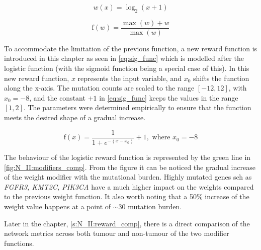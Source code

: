\begin{equation} \label{eq:w}
    w(x) = \log_2(x+1)
\end{equation}

\begin{equation} \label{eq:norm3_func}
\text{f}(w) = \frac{\max(w) + w}{\max(w)}
\end{equation}

To accommodate the limitation of the previous function, a new reward function is introduced in this chapter as seen in \cref{eq:sig_func} which is modelled after the logistic function (with the sigmoid function being a special case of this). In this new reward function, $x$ represents the input variable, and $x_0$ shifts the function along the x-axis. The mutation counts are scaled to the range $[-12, 12]$, with $x_0 = -8$, and the constant $+1$ in \cref{eq:sig_func} keeps the values in the range $[1, 2]$. The parameters were determined empirically to ensure that the function meets the desired shape of a gradual increase.

\begin{equation} \label{eq:sig_func}
\text{f}(x) =  \frac{1}{1 + e^{-(x - x_0)}} + 1, \text{ where } x_0=-8
\end{equation}

The behaviour of the logistic reward function is represented by the green line in \cref{fig:N_II:modifiers_comp}. From the figure it can be noticed the gradual increase of the weight modifier with the mutational burden. Highly mutated genes sch as \textit{FGFR3, KMT2C, PIK3CA} have a much higher impact on the weights compared to the previous weight function. It also worth noting that a 50\% increase of the weight value happens at a point of $\sim30$ mutation burden.

Later in the chapter, \cref{s:N_II:reward_comp}, there is a direct comparison of the network metrics across both tumour and non-tumour of the two modifier functions.

